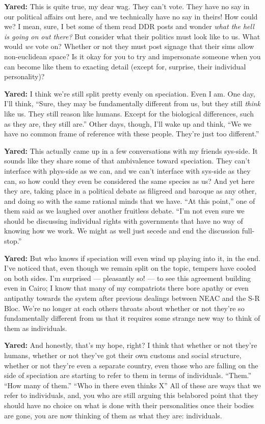 \textbf{Yared:} This is quite true, my dear wag. They can't vote. They have no say in our political affairs out here, and we technically have no say in theirs! How could we? I mean, sure, I bet some of them read DDR posts and wonder \emph{what the hell is going on out there?} But consider what their politics must look like to us. What would \emph{we} vote on? Whether or not they must post signage that their sims allow non-euclidean space? Is it okay for you to try and impersonate someone when you can become like them to exacting detail (except for, surprise, their individual personality)?

\textbf{Yared:} I think we're still split pretty evenly on speciation. Even I am. One day, I'll think, ``Sure, they may be fundamentally different from us, but they still \emph{think} like us. They still reason like humans. Except for the biological differences, such as they are, they still are.'' Other days, though, I'll wake up and think, ``We we have no common frame of reference with these people. They're just too different.''

\textbf{Yared:} This actually came up in a few conversations with my friends sys-side. It sounds like they share some of that ambivalence toward speciation. They can't interface with phys-side as we can, and we can't interface with sys-side as they can, so how could they even be considered the same species as us? And yet here they are, taking place in a political debate as filigreed and baroque as any other, and doing so with the same rational minds that we have. ``At this point,'' one of them said as we laughed over another fruitless debate. ``I'm not even sure we should be discussing individual rights with governments that have no way of knowing how we work. We might as well just secede and end the discussion full-stop.''

\textbf{Yared:} But who knows if speciation will even wind up playing into it, in the end. I've noticed that, even though we remain split on the topic, tempers have cooled on both sides. I'm surprised — pleasantly so! — to see this agreement building even in Cairo; I know that many of my compatriots there bore apathy or even antipathy towards the system after previous dealings between NEAC and the S-R Bloc. We're no longer at each others throats about whether or not they're so fundamentally different from us that it requires some strange new way to think of them as individuals.

\textbf{Yared:} And honestly, that's my hope, right? I think that whether or not they're humans, whether or not they've got their own customs and social structure, whether or not they're even a separate country, even those who are falling on the side of speciation are starting to refer to them in terms of individuals. ``Them.'' ``How many of them.'' ``Who in there even thinks X'' All of these are ways that we refer to individuals, and, you who are still arguing this belabored point that they should have no choice on what is done with their personalities once their bodies are gone, you are now thinking of them as what they are: individuals.


